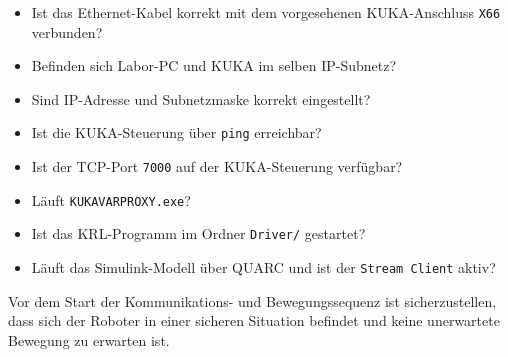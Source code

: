 \begin{itemize}
\item Ist das Ethernet-Kabel korrekt mit dem vorgesehenen
KUKA-Anschluss \texttt{X66} verbunden?
\item Befinden sich Labor-PC und KUKA im selben IP-Subnetz?
\item Sind IP-Adresse und Subnetzmaske korrekt eingestellt?
\item Ist die KUKA-Steuerung über \texttt{ping} erreichbar?
\item Ist der TCP-Port \texttt{7000} auf der KUKA-Steuerung
verfügbar?
\item Läuft \texttt{KUKAVARPROXY.exe}?
\item Ist das KRL-Programm im Ordner \texttt{Driver/} gestartet?
\item Läuft das Simulink-Modell über QUARC und ist der
\texttt{Stream Client} aktiv?
\end{itemize}

Vor dem Start der Kommunikations- und Bewegungssequenz ist
sicherzustellen, dass sich der Roboter in einer sicheren Situation
befindet und keine unerwartete Bewegung zu erwarten ist.
